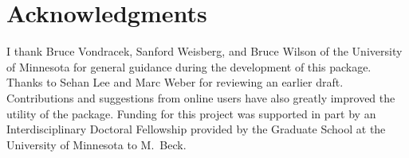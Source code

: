 \documentclass[article]{jss}
\begin{document}
\section*{Acknowledgments}
 
I thank Bruce Vondracek, Sanford Weisberg, and Bruce Wilson of the
University of Minnesota for general guidance during the development of
this package.  Thanks to Sehan Lee and Marc Weber for reviewing an
earlier draft.  Contributions and suggestions from online users have
also greatly improved the utility of the package.  Funding for this
project was supported in part by an Interdisciplinary Doctoral
Fellowship provided by the Graduate School at the University of
Minnesota to M.~Beck.


\end{document}
